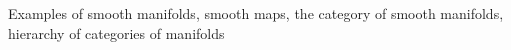 Examples of smooth manifolds, smooth maps, the category of smooth manifolds, hierarchy of categories of manifolds